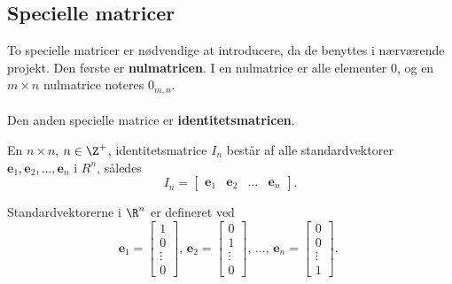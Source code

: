 \subsection{Specielle matricer} 
To specielle matricer er nødvendige at introducere, da de benyttes i nærværende projekt. Den første er \textbf{nulmatricen}. I en nulmatrice er alle elementer $0$, og en $m \times n$ nulmatrice noteres $0_{m,n}$.
% 
%
\\\\
Den anden specielle matrice er \textbf{identitetsmatricen}. 
%
\begin{defn}{}{}
%
En $n \times n$, $n \in \Z^+$, identitetsmatrice $I_n$ består af alle standardvektorer $\textbf{e}_1, \textbf{e}_2, \ldots, \textbf{e}_n$ i $R^n$, således 
$$
I_n=
\begin{bmatrix}
\textbf{e}_1 & \textbf{e}_2 & \ldots & \textbf{e}_n
\end{bmatrix}.
$$ 
\end{defn}
\noindent
%
Standardvektorerne i $\R^n$ er defineret ved 
%
%
$$
\textbf{e}_1=
\begin{bmatrix}
1 \\ 
0 \\ 
\vdots \\
0
\end{bmatrix}
\text{, }
\textbf{e}_2=
\begin{bmatrix}
0 \\ 
1 \\ 
\vdots \\
0
\end{bmatrix}
\text{, }
\ldots
\text{, }
\textbf{e}_n=
\begin{bmatrix}
0 \\ 
0 \\ 
\vdots \\
1
\end{bmatrix}
\text{. }
$$